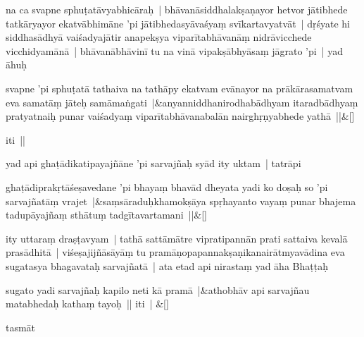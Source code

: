 \documentclass[article,12pt,a4paper]{memoir}%
\newcounter{parCount}
\begin{document}
	  \pstart \leavevmode%
	\label{thakur75-5.30}na ca svapne sphuṭatāvyabhicāraḥ | bhāvanāsiddhalakṣaṇayor hetvor jātibhede tatkāryayor ekatvābhimāne 'pi jātibhedasyāvaśyaṃ svīkartavyatvāt | dṛśyate hi siddhasādhyā vaiśadyajātir anapekṣya viparītabhāvanāṃ nidrāvicchede vicchidyamānā | bhāvanābhāvinī tu na vinā vipakṣābhyāsaṃ jāgrato 'pi | yad āhuḥ 
	{}
	\pend%
      
	    
	    \stanza[\smallbreak]
	  svapne 'pi sphuṭatā tathaiva na tathāpy ekatvam evānayor na prākārasamatvam eva samatāṃ jāteḥ samāmaṅgati |&anyanniddhanirodhabādhyam itaradbādhyaṃ pratyatnaiḥ punar vaiśadyaṃ viparītabhāvanabalān nairghṛṇyabhede yathā ||\&[\smallbreak]
	  
	  
	  

	  \pstart \leavevmode%
	iti ||
	{}
	\pend%
      

	  \pstart \leavevmode%
	\label{thakur75-6.5}yad api ghaṭādikatipayajñāne 'pi sarvajñaḥ syād ity uktam | tatrāpi 
	{}
	\pend%
      
	    
	    \stanza[\smallbreak]
	  ghaṭādiprakṛtāśeṣavedane 'pi bhayaṃ bhavād dheyata yadi ko doṣaḥ so 'pi sarvajñatāṃ vrajet |&saṃsāraduḥkhamokṣāya spṛhayanto vayaṃ punar bhajema tadupāyajñaṃ sthātuṃ tadgītavartamani ||\&[\smallbreak]
	  
	  
	  

	  \pstart \leavevmode%
	ity uttaraṃ draṣṭavyam | tathā sattāmātre vipratipannān prati sattaiva kevalā prasādhitā | viśeṣajijñāsāyāṃ tu pramāṇopapannakṣaṇikanairātmyavādina eva sugatasya bhagavataḥ sarvajñatā | ata etad api nirastaṃ yad āha Bhaṭṭaḥ 
	{}
	\pend%
      
	    
	    \stanza[\smallbreak]
	  \label{rna-ts-3149}sugato yadi sarvajñaḥ kapilo neti kā pramā |&athobhāv api sarvajñau matabhedaḥ kathaṃ tayoḥ || iti | \&[\smallbreak]
	  
	  
	  

	  \pstart \leavevmode%
	tasmāt 
	{}
	\pend%
      
\end{document}
